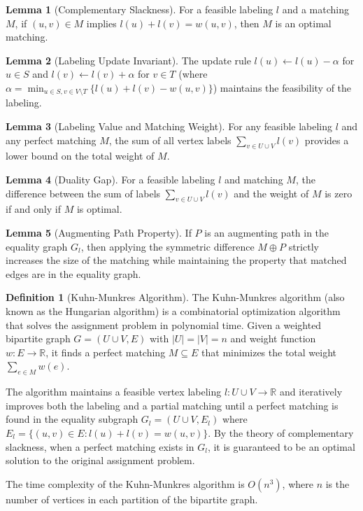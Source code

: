 \documentclass{article}
\theoremstyle{definition}
\newtheorem{lemma}{Lemma}
\newtheorem{definition}{Definition}
\begin{document}
\begin{lemma}[Complementary Slackness]
For a feasible labeling $l$ and a matching $M$, if $(u,v) \in M$ implies $l(u) + l(v) = w(u,v)$, then $M$ is an optimal matching.
\end{lemma}

\begin{lemma}[Labeling Update Invariant]
The update rule $l(u) \gets l(u) - \alpha$ for $u \in S$ and $l(v) \gets l(v) + \alpha$ for $v \in T$ (where $\alpha = \min_{u \in S, v \in V \setminus T} \{l(u) + l(v) - w(u,v)\}$) maintains the feasibility of the labeling.
\end{lemma}

\begin{lemma}[Labeling Value and Matching Weight]
For any feasible labeling $l$ and any perfect matching $M$, the sum of all vertex labels $\sum_{v \in U \cup V} l(v)$ provides a lower bound on the total weight of $M$.
\end{lemma}

\begin{lemma}[Duality Gap]
For a feasible labeling $l$ and matching $M$, the difference between the sum of labels $\sum_{v \in U \cup V} l(v)$ and the weight of $M$ is zero if and only if $M$ is optimal.
\end{lemma}


\begin{lemma}[Augmenting Path Property]
If $P$ is an augmenting path in the equality graph $G_l$, then applying the symmetric difference $M \oplus P$ strictly increases the size of the matching while maintaining the property that matched edges are in the equality graph.
\end{lemma}

\begin{definition}[Kuhn-Munkres Algorithm]
The Kuhn-Munkres algorithm (also known as the Hungarian algorithm) is a combinatorial optimization algorithm that solves the assignment problem in polynomial time. Given a weighted bipartite graph $G = (U \cup V, E)$ with $|U| = |V| = n$ and weight function $w: E \rightarrow \mathbb{R}$, it finds a perfect matching $M \subseteq E$ that minimizes the total weight $\sum_{e \in M} w(e)$. 

The algorithm maintains a feasible vertex labeling $l: U \cup V \rightarrow \mathbb{R}$ and iteratively improves both the labeling and a partial matching until a perfect matching is found in the equality subgraph $G_l = (U \cup V, E_l)$ where $E_l = \{(u,v) \in E : l(u) + l(v) = w(u,v)\}$. By the theory of complementary slackness, when a perfect matching exists in $G_l$, it is guaranteed to be an optimal solution to the original assignment problem.

The time complexity of the Kuhn-Munkres algorithm is $O(n^3)$, where $n$ is the number of vertices in each partition of the bipartite graph.
\end{definition}
\end{document}
